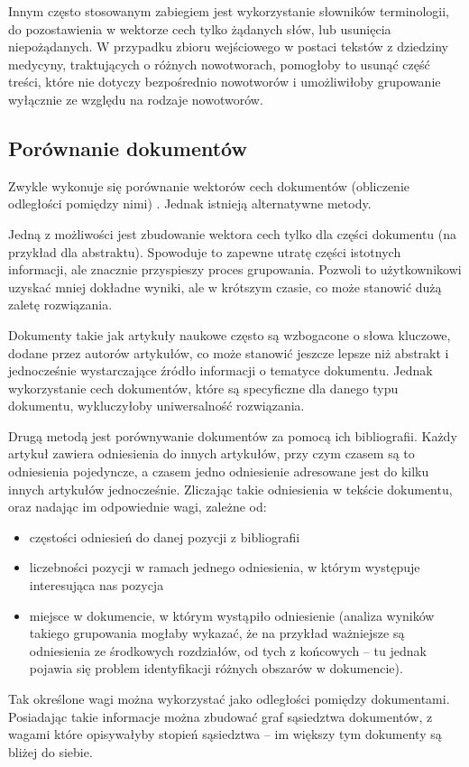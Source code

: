 \documentclass{article}
\begin{document}
Innym  często stosowanym zabiegiem jest wykorzystanie słowników terminologii, do pozostawienia w wektorze cech tylko żądanych słów, lub usunięcia niepożądanych. W przypadku zbioru wejściowego w postaci tekstów z dziedziny medycyny, traktujących o różnych nowotworach, pomogłoby to usunąć część treści, które nie dotyczy bezpośrednio nowotworów i umożliwiłoby grupowanie wyłącznie ze względu na rodzaje nowotworów.

\subsection{Porównanie dokumentów}

Zwykle wykonuje się porównanie wektorów cech dokumentów (obliczenie odległości pomiędzy nimi) \todo{[4]}. Jednak istnieją alternatywne metody. 

Jedną z możliwości jest zbudowanie wektora cech tylko dla części dokumentu (na przykład dla abstraktu). Spowoduje to zapewne utratę części istotnych informacji, ale znacznie przyspieszy proces grupowania. Pozwoli to użytkownikowi uzyskać mniej dokładne wyniki, ale w krótszym czasie, co może stanowić dużą zaletę rozwiązania. 

Dokumenty takie jak artykuły naukowe często są wzbogacone o słowa kluczowe, dodane przez autorów artykułów, co może stanowić jeszcze lepsze niż abstrakt i jednocześnie wystarczające źródło informacji o tematyce dokumentu. Jednak wykorzystanie cech dokumentów, które są specyficzne dla danego typu dokumentu, wykluczyłoby uniwersalność rozwiązania.

Drugą metodą jest porównywanie dokumentów za pomocą ich bibliografii. Każdy artykuł zawiera odniesienia do innych artykułów, przy czym czasem są to odniesienia pojedyncze, a czasem jedno odniesienie adresowane jest do kilku innych artykułów jednocześnie. Zliczając takie odniesienia w tekście dokumentu, oraz nadając im odpowiednie wagi, zależne od:

\begin{itemize}
	\item częstości odniesień do danej pozycji z bibliografii
	\item liczebności pozycji w ramach jednego odniesienia, w którym występuje interesująca nas pozycja
	\item miejsce w dokumencie, w którym wystąpiło odniesienie (analiza wyników takiego grupowania mogłaby wykazać, że na przykład ważniejsze są odniesienia ze środkowych rozdziałów, od tych z końcowych – tu jednak pojawia się problem identyfikacji różnych obszarów w dokumencie).
\end{itemize}
Tak określone wagi można wykorzystać jako odległości pomiędzy dokumentami. Posiadając takie informacje można zbudować graf sąsiedztwa dokumentów, z wagami które opisywałyby stopień sąsiedztwa – im większy tym dokumenty są bliżej do siebie. 
\end{document}
